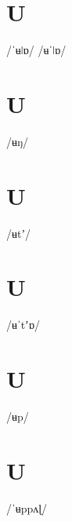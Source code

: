 \documentclass[10pt,a4paper,twoside]{book}
\begin{document}
\section*{U}

\begin{multicols}{3}
 {/ˈʉǀɒ/} {}
 {/ʉˈǀɒ/} {}
\end{multicols}

\section*{U}

\begin{multicols}{3}
 {/ʉŋ/} {}
\end{multicols}

\section*{U}

\begin{multicols}{3}
 {/ʉtʼ/} {}
\end{multicols}

\section*{U}

\begin{multicols}{3}
 {/ʉˈtʼɒ/} {}
\end{multicols}

\section*{U}

\begin{multicols}{3}
 {/ʉp/} {}
\end{multicols}

\section*{U}

\begin{multicols}{3}
 {/ˈʉppʌɭ/} {}
\end{multicols}
\end{document}
